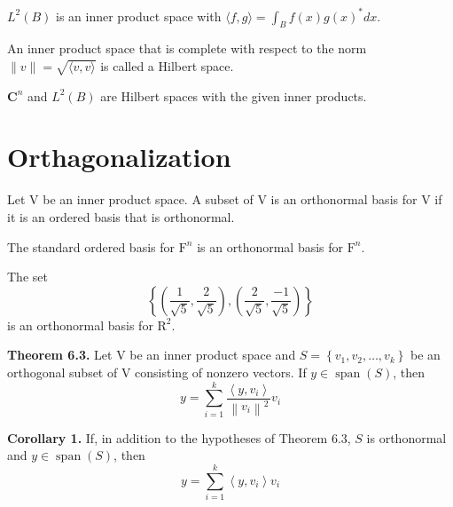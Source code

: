 \documentclass{report}
\begin{document}
    \begin{Example}
    $L^{2}(B)$ is an inner product space with $\langle f, g \rangle = \int_{B} f(x) g(x)^{*} dx$.
    \end{Example}

    \begin{defBox}
    An inner product space that is complete with respect to the norm $\|v\| = \sqrt{\langle v, v \rangle}$ is called a Hilbert space.
    \end{defBox}

    \begin{Example}
    $\mathbf{C}^{n}$ and $L^{2}(B)$ are Hilbert spaces with the given inner products.
    \end{Example}

    \section{Orthagonalization}

    \begin{defBox}
        Let $\mathrm{V}$ be an inner product space. A subset of $\mathrm{V}$ is an orthonormal basis for $\mathrm{V}$ if it is an ordered basis that is orthonormal.
    \end{defBox}

    \begin{Example}
        The standard ordered basis for $\mathrm{F}^{n}$ is an orthonormal basis for $\mathrm{F}^{n}$.
    \end{Example}

    \begin{Example}
        The set
        $$
        \left\{\left(\frac{1}{\sqrt{5}}, \frac{2}{\sqrt{5}}\right),\left(\frac{2}{\sqrt{5}}, \frac{-1}{\sqrt{5}}\right)\right\}
        $$
        is an orthonormal basis for $\mathrm{R}^{2}$.
    \end{Example}

    \begin{thBox}
        \textbf{Theorem 6.3.} Let $\mathrm{V}$ be an inner product space and $S=\left\{v_{1}, v_{2}, \ldots, v_{k}\right\}$ be an orthogonal subset of $\mathrm{V}$ consisting of nonzero vectors. If $y \in \operatorname{span}(S)$, then
        $$
        y = \sum_{i=1}^{k} \frac{\left\langle y, v_{i}\right\rangle}{\left\|v_{i}\right\|^{2}} v_{i}
        $$
    \end{thBox}

    \begin{thBox}
        \textbf{Corollary 1.} If, in addition to the hypotheses of Theorem 6.3, $S$ is orthonormal and $y \in \operatorname{span}(S)$, then
        $$
        y = \sum_{i=1}^{k}\left\langle y, v_{i}\right\rangle v_{i}
        $$
    \end{thBox}
\end{document}
